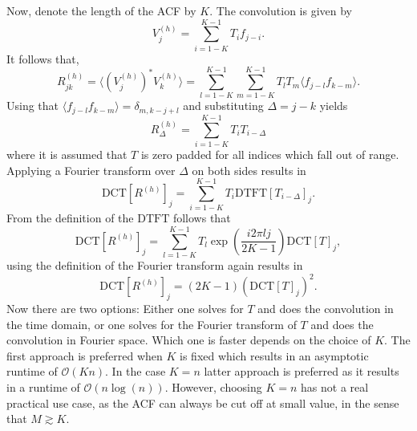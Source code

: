 \documentclass[18pt,a4paper]{extarticle}
\begin{document}
Now, denote the length of the ACF by $K$.
The convolution is given by
\begin{equation}
V_j^{(h)} = \sum_{i=1-K}^{K-1} T_{i}f_{j - i}.
\end{equation}
It follows that,
\begin{equation}
R^{(h)}_{jk} = \langle (V_{j}^{(h)})^* V_k^{(h)} \rangle = \sum_{l=1-K}^{K-1} \sum_{m=1 - K}^{K-1} T_{l} T_{m} \langle f_{j - l} f_{k - m} \rangle.
\end{equation}
Using that $\langle f_{j - l} f_{k - m} \rangle = \delta_{m, k - j + l}$ and substituting $\Delta=j-k$ yields
\begin{equation}
R^{(h)}_\Delta = \sum_{i=1-K}^{K-1} T_{i} T_{i - \Delta}
\end{equation}
where it is assumed that $T$ is zero padded for all indices which fall out of range.
Applying a Fourier transform over $\Delta$ on both sides results in
\begin{equation}
\mathrm{DCT}[R^{(h)}]_j = \sum_{i=1-K}^{K-1} T_{i}\mathrm{DTFT}[T_{i - \Delta}]_j.
\end{equation}
From the definition of the $\mathrm{DTFT}$ follows that
\begin{equation}
\mathrm{DCT}[R^{(h)}]_j = \sum_{l=1-K}^{K-1} T_{l}\exp\left(\frac{i2\pi lj}{2K-1} \right) \mathrm{DCT}[T]_j,
\end{equation}
using the definition of the Fourier transform again results in
\begin{equation}
\mathrm{DCT}[R^{(h)}]_j = (2K - 1)\left( \mathrm{DCT}[T]_j \right)^2.
\end{equation}
Now there are two options: Either one solves for $T$ and does the convolution in the time domain, or one solves for the Fourier transform of $T$ and does the convolution in Fourier space.
Which one is faster depends on the choice of $K$.
The first approach is preferred when $K$ is fixed which results in an asymptotic runtime of $\mathcal{O}(Kn)$.
In the case $K=n$ latter approach is preferred as it results in a runtime of $\mathcal{O}(n\log(n))$.
However, choosing $K=n$ has not a real practical use case, as the ACF can always be cut off at small value, in the sense that $M \gtrsim K$.
\end{document}
